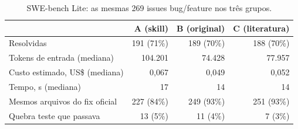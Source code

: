 \begin{table}[t]
\caption{SWE-bench Lite: as mesmas 269 issues bug/feature nos três grupos.}
\label{tab:swebench}
\small
\begin{tabular}{lrrr}
\toprule
 & A (skill) & B (original) & C (literatura) \\
\midrule
Resolvidas & 191 (71\%) & 189 (70\%) & 188 (70\%) \\
Tokens de entrada (mediana) & 104.201 & 74.428 & 77.957 \\
Custo estimado, US\$ (mediana) & 0,067 & 0,049 & 0,052 \\
Tempo, s (mediana) & 17 & 14 & 14 \\
Mesmos arquivos do fix oficial & 227 (84\%) & 249 (93\%) & 251 (93\%) \\
Quebra teste que passava & 13 (5\%) & 11 (4\%) & 7 (3\%) \\
\bottomrule
\end{tabular}
\end{table}
